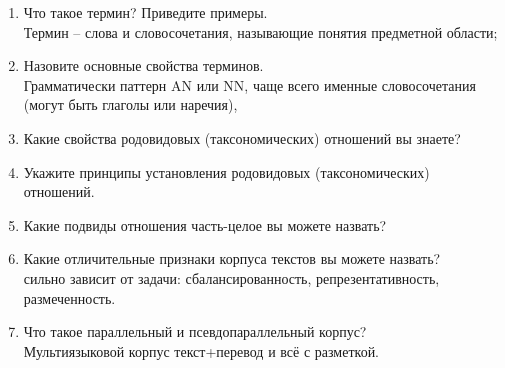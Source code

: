\documentclass[a4paper]{article}
\begin{document}
\begin{enumerate}
	\item Что такое термин? Приведите примеры.\hfill\\
	Термин -- слова и словосочетания, называющие понятия предметной области;

	\item Назовите основные свойства терминов.\hfill\\
	Грамматически паттерн AN или NN, чаще всего именные словосочетания (могут быть глаголы или наречия),

	\item Какие свойства родовидовых (таксономических) отношений вы знаете?\hfill\\
	\item Укажите принципы установления родовидовых (таксономических) отношений.\hfill\\
	\item Какие подвиды отношения часть-целое вы можете назвать?\hfill\\

	\item Какие отличительные признаки корпуса текстов вы можете назвать?\hfill\\
	сильно зависит от задачи: сбалансированность, репрезентативность, размеченность.

	\item Что такое параллельный и псевдопараллельный корпус?\hfill\\
	Мультиязыковой корпус текст+перевод и всё с разметкой.


\end{enumerate}
\end{document}
